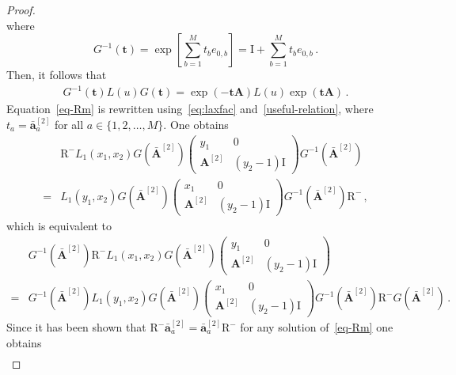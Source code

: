 \documentclass[10pt,a4paper]{amsart}
\newcommand{\ID}{\mathrm{I}}
\newcommand{\M}{M}
\newcommand{\OA}{\mathbf{A}}
\newcommand{\OAD}{\mathbf{\bar{A}}}
\newcommand{\abrOSCR}{\mathrm{R}}
\newcommand{\oad}{\mathbf{\bar{a}}}
\begin{document}
\begin{proof}
\begin{equation}
\end{equation}
where
\begin{equation}
	G^{-1}(\mathbf{t})=\exp{\left[\sum_{b=1}^{\M}t_{b}e_{0,b}\right]}=\ID+\sum_{b=1}^{\M}t_{b}e_{0,b}
	 \,.
\end{equation}
Then, it follows that
\begin{align}\label{useful-relation}
	G^{-1}(\mathbf{t})L(u)G(\mathbf{t})=\exp{\left(-\mathbf{t}\OA\right)} L(u)\exp{\left(\mathbf{t}\OA\right)}\,.
\end{align}
Equation~\eqref{eq-Rm} is rewritten using~\eqref{eq:laxfac} and~\eqref{useful-relation}, where $t_{a}={\oad}_{a}^{[2]}$ for all $a\in \{1,2,\ldots,\M\}$. One obtains
\begin{equation}
	\begin{split}
		&\abrOSCR^{-}L_{1}(x_{1},x_{2})G(\OAD^{[2]})\left(\begin{array}{cc}
			y_{1}&0\\
			\OA^{[2]}&(y_{2}-1)\ID
		\end{array}\right)G^{-1}(\OAD^{[2]})
		\\=&
		L_{1}(y_{1},x_{2})G(\OAD^{[2]})\left(\begin{array}{cc}
			x_1&0\\
			\OA^{[2]}&(y_{2}-1)\ID
		\end{array}\right)G^{-1}(\OAD^{[2]})\abrOSCR^{-}\,,
	\end{split}
\end{equation}
which is equivalent to
\begin{equation}
	\begin{split}
		&G^{-1}(\OAD^{[2]})\abrOSCR^{-}L_{1}(x_{1},x_{2})G(\OAD^{[2]})\left(\begin{array}{cc}
			y_{1}&0\\
			\OA^{[2]}&(y_{2}-1)\ID
		\end{array}\right)
		\\=&
		G^{-1}(\OAD^{[2]})L_{1}(y_{1},x_{2})G(\OAD^{[2]})\left(\begin{array}{cc}
			x_1&0\\
			\OA^{[2]}&(y_{2}-1)\ID
		\end{array}\right)G^{-1}(\OAD^{[2]})\abrOSCR^{-}G(\OAD^{[2]})\,.
	\end{split}
\end{equation}
Since it has been shown that $\abrOSCR^{-}{\oad}_{a}^{[2]}={\oad}_{a}^{[2]}\abrOSCR^{-}$  for any solution of~\eqref{eq-Rm} one obtains
\begin{equation}
	\begin{split}

\end{split}
\end{equation}
\end{proof}
\end{document}
